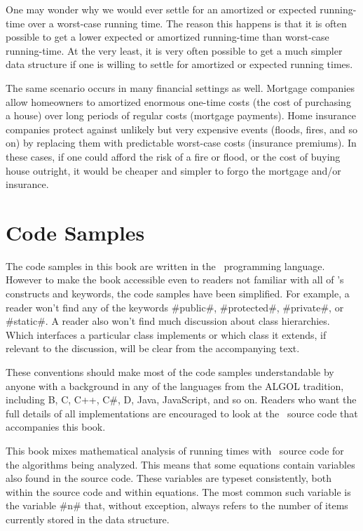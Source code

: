 One may wonder why we would ever settle for an amortized or expected
running-time over a worst-case running time.  The reason this happens
is that it is often possible to get a lower expected or amortized
running-time than worst-case running-time.  At the very least, it is very
often possible to get a much simpler data structure if one is willing to
settle for amortized or expected running times.

The same scenario occurs in many financial settings as well.  Mortgage
companies allow homeowners to amortized enormous one-time costs
(the cost of purchasing a house) over long periods of regular costs
(mortgage payments).  Home insurance companies protect against unlikely
but very expensive events (floods, fires, and so on) by replacing them
with predictable worst-case costs (insurance premiums).   In these cases,
if one could afford the risk of a fire or flood, or the cost of buying
house outright, it would be cheaper and simpler to forgo the mortgage
and/or insurance.


\section{Code Samples}

The code samples in this book are written in the \lang\ programming
language.  However to make the book accessible even to readers not
familiar with all of \lang's constructs and keywords, the code samples
have been simplified.  For example, a reader won't find any of the
keywords #public#, #protected#, #private#, or #static#.  A reader also
won't find much discussion about class hierarchies.  Which interfaces
a particular class implements or which class it extends, if relevant to
the discussion, will be clear from the accompanying text.

These conventions should make most of the code samples understandable by
anyone with a background in any of the languages from the ALGOL tradition,
including B, C, C++, C\#, D, Java, JavaScript, and so on.  Readers who want
the full details of all implementations are encouraged to look at the
\lang\ source code that accompanies this book.

This book mixes mathematical analysis of running times with \lang\
source code for the algorithms being analyzed.  This means that
some equations contain variables also found in the source code.
These variables are typeset consistently, both within the source code
and within equations.  The most common such variable is the variable #n#
that, without exception, always refers to the number of items currently
stored in the data structure.

